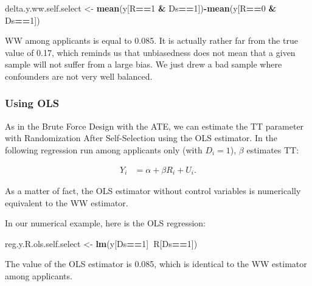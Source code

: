 \documentclass[]{book}
\newenvironment{Shaded}{\begin{snugshade}}{\end{snugshade}}
\newcommand{\KeywordTok}[1]{\textcolor[rgb]{0.13,0.29,0.53}{\textbf{#1}}}
\newcommand{\DecValTok}[1]{\textcolor[rgb]{0.00,0.00,0.81}{#1}}
\newcommand{\StringTok}[1]{\textcolor[rgb]{0.31,0.60,0.02}{#1}}
\newcommand{\OperatorTok}[1]{\textcolor[rgb]{0.81,0.36,0.00}{\textbf{#1}}}
\newcommand{\NormalTok}[1]{#1}
\theoremstyle{definition}
\theoremstyle{definition}
\theoremstyle{definition}
\theoremstyle{remark}
\let\BeginKnitrBlock\begin \let\EndKnitrBlock\end
\begin{document}
\begin{Shaded}
\begin{Highlighting}[]
\NormalTok{delta.y.ww.self.select <-}\StringTok{ }\KeywordTok{mean}\NormalTok{(y[R}\OperatorTok{==}\DecValTok{1} \OperatorTok{&}\StringTok{ }\NormalTok{Ds}\OperatorTok{==}\DecValTok{1}\NormalTok{])}\OperatorTok{-}\KeywordTok{mean}\NormalTok{(y[R}\OperatorTok{==}\DecValTok{0} \OperatorTok{&}\StringTok{ }\NormalTok{Ds}\OperatorTok{==}\DecValTok{1}\NormalTok{])}
\end{Highlighting}
\end{Shaded}

WW among applicants is equal to 0.085. It is actually rather far from
the true value of 0.17, which reminds us that unbiasedness does not mean
that a given sample will not suffer from a large bias. We just drew a
bad sample where confounders are not very well balanced.

\subsubsection{Using OLS}\label{using-ols-1}

As in the Brute Force Design with the ATE, we can estimate the TT
parameter with Randomization After Self-Selection using the OLS
estimator. In the following regression run among applicants only (with
\(D_i=1\)), \(\beta\) estimates TT:

\begin{align*}
    Y_i &  = \alpha +  \beta R_i + U_i.
    \end{align*}

As a matter of fact, the OLS estimator without control variables is
numerically equivalent to the WW estimator.

\BeginKnitrBlock{example}
\protect\hypertarget{exm:unnamed-chunk-84}{}{\label{exm:unnamed-chunk-84}
}In our numerical example, here is the OLS regression:
\EndKnitrBlock{example}

\begin{Shaded}
\begin{Highlighting}[]
\NormalTok{reg.y.R.ols.self.select <-}\StringTok{ }\KeywordTok{lm}\NormalTok{(y[Ds}\OperatorTok{==}\DecValTok{1}\NormalTok{]}\OperatorTok{~}\NormalTok{R[Ds}\OperatorTok{==}\DecValTok{1}\NormalTok{])}
\end{Highlighting}
\end{Shaded}

The value of the OLS estimator is 0.085, which is identical to the WW
estimator among applicants.
\end{document}
